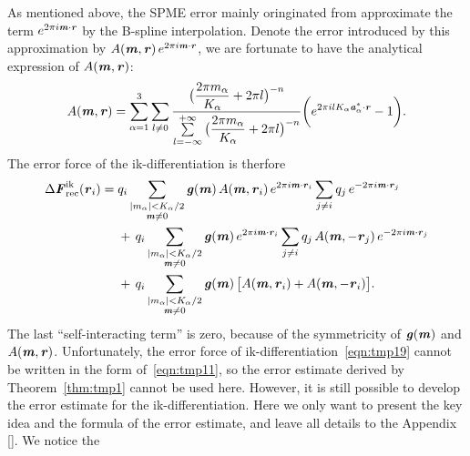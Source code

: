 \documentclass[aps,pre,preprint]{revtex4}
\renewcommand{\v}[1]{\textbf{\textit{#1}}}
\begin{document}
As mentioned above, the SPME error mainly oringinated from approximate
the term $e^{2\pi i\v m\cdot\v r}$ by the B-spline
interpolation. Denote the error introduced by this approximation by
$A(\v m, \v r)\,e^{2\pi i\v m\cdot \v r}$, we are fortunate to have
the analytical expression of $A(\v m, \v r)$:
\begin{align}\label{eqn:tmp18}
  A(\v m, \v r)
  =
  \sum_{\alpha=1}^3\sum_{l\neq 0}
  \frac
  {\big(\dfrac{2\pi m_\alpha}{K_\alpha} + 2\pi l\big)^{-n}}
  {\sum\limits_{l=-\infty}^{+\infty}
    \big(\dfrac{2\pi m_\alpha}{K_\alpha} + 2\pi l\big)^{-n}}
  \bigg(
  e^{2\pi i l K_\alpha\v a^\ast_\alpha\cdot \v r} - 1
  \bigg).
\end{align}
The error force of the ik-differentiation is therfore
\begin{align}\nonumber
  \Delta\v F_{\textrm{rec}}^{\textrm{ik}}(\v r_i)
  =\;&
  q_i
  \sum_{
    \begin{subarray}{c}
      \vert m_{\alpha}\vert < K_\alpha/2\\
      \v m\neq 0
    \end{subarray}}
  \v g(\v m)\,
  A(\v m, \v r_i)\,
  e^{2\pi i\v m\cdot \v r_i}
  \sum_{j\neq i}q_j\,e^{-2\pi i\v m\cdot\v r_j} \\\nonumber
  & +\,
  q_i
  \sum_{
    \begin{subarray}{c}
      \vert m_{\alpha}\vert < K_\alpha/2\\
      \v m\neq 0
    \end{subarray}}
  \v g(\v m)\,
  e^{2\pi i\v m\cdot \v r_i}
  \sum_{j\neq i}q_j\,A(\v m, -\v r_j)\,e^{-2\pi i\v m\cdot\v r_j}\\\label{eqn:tmp19}
  & +\,
  q_i
  \sum_{
    \begin{subarray}{c}
      \vert m_{\alpha}\vert < K_\alpha/2\\
      \v m\neq 0
    \end{subarray}}
  \v g(\v m)\,
  \big[
  A(\v m, \v r_i) +
  A(\v m, -\v r_i)
  \big].
\end{align}
The last ``self-interacting term'' is zero, because of the
symmetricity of $\v g(\v m)$ and $A(\v m, \v r)$.  Unfortunately, the
error force of ik-differentiation~\eqref{eqn:tmp19} cannot be written
in the form of~\eqref{eqn:tmp11}, so the error estimate derived by
Theorem~\ref{thm:tmp1} cannot be used here. However, it is still
possible to develop the error estimate for the ik-differentiation.
Here we only want to present the key idea and the formula of the error
estimate, and leave all details to the Appendix \ref{}.  We notice the
\end{document}
